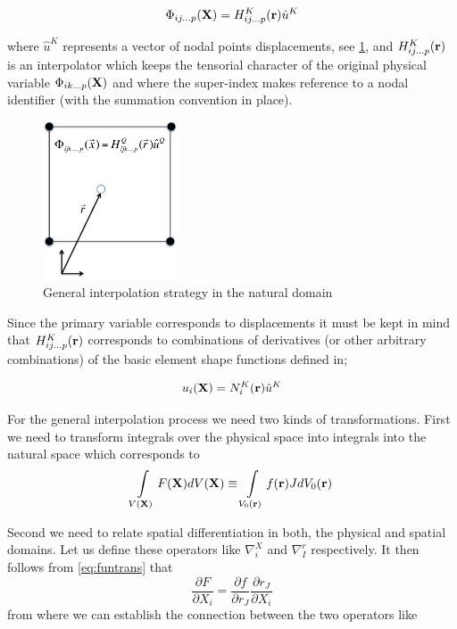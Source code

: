 \begin{equation}
\Phi_{ij...p}(\vb{X})=H_{ij...p}^K(\vb{r})\hat{u}^K
\label{eq:interpol}
\end{equation}

where $\hat{u}^K$ represents a vector of nodal points displacements, see \cref{fig:interpol nat dom}, and $H_{ij...p}^K(\vb{r})$ is an interpolator which keeps the tensorial character of the original physical variable $\Phi_{ik...p}(\vb{X})$ and where the super-index makes reference to a nodal identifier (with the summation convention in place).


\begin{figure}[h]
\centering
\includegraphics[width=4cm]{figure2.pdf}
\caption{General interpolation strategy in the natural domain}
\label{fig:interpol nat dom}
\end{figure}
 


Since the primary variable corresponds to displacements it must be kept in mind that $H_{ij...p}^K(\vb{r})$ corresponds to combinations of derivatives (or other arbitrary combinations) of the basic element shape functions defined in;


\begin{equation}
u_i(\vb{X})=N_i^K(\vb{r})\hat{u}^K
\label{eq:el interpol}
\end{equation}



For the general interpolation process we need two kinds of transformations.  First we need to transform integrals over the physical space into integrals into the natural space which corresponds to
\begin{equation}
\int\limits_{V(\vb{X})} F(\vb{X})dV(\vb{X})\equiv \int\limits_{V_0(\vb{r})} f(\vb{r})J dV_0(\vb{r})
\label{gen trans}
\end{equation}



Second we need to relate spatial differentiation in both, the physical and spatial domains.  Let us define these operators like $\nabla_i^X$ and $\nabla_I^r$ respectively. It then follows from \cref{eq:funtrans} that
\begin{equation}
\dfrac{\partial F}{\partial X_i}=\dfrac{\partial f}{\partial r_J}\dfrac{\partial r_J}{\partial X_i}
\label{eq:chain}
\end{equation}
from where we can establish the connection between the two operators like


